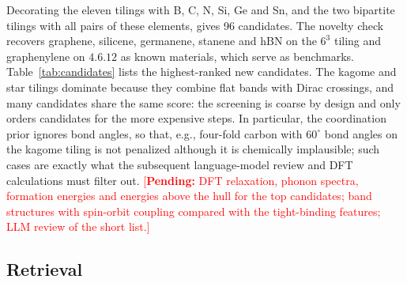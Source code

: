 \documentclass[prmaterials,twocolumn,superscriptaddress,longbibliography,nofootinbib]{revtex4-2}
\newcommand{\pending}[1]{\textcolor{red}{[\textbf{Pending:} #1]}}
\begin{document}
\begin{table}[t]
\caption{Highest-ranked new candidates for B, C, N, Si, Ge and Sn before any first-principles
calculation: tiling, coordination $z$, first-guess bond length $d$ from covalent radii,
flat bands, linear crossings and screening score.}
\label{tab:candidates}
\footnotesize

\end{table}

Decorating the eleven tilings with B, C, N, Si, Ge and Sn, and the two bipartite tilings
with all pairs of these elements, gives 96 candidates. The novelty check recovers graphene,
silicene, germanene, stanene and hBN on the $6^3$ tiling and graphenylene on $4.6.12$ as
known materials, which serve as benchmarks. Table~\ref{tab:candidates} lists the
highest-ranked new candidates. The kagome and star tilings dominate because they combine flat
bands with Dirac crossings, and many candidates share the same score: the screening is
coarse by design and only orders candidates for the more expensive steps. In particular, the
coordination prior ignores bond angles, so that, e.g., four-fold carbon with $60^\circ$ bond
angles on the kagome tiling is not penalized although it is chemically implausible; such
cases are exactly what the subsequent language-model review and DFT calculations must filter
out. \pending{DFT relaxation, phonon spectra, formation energies and energies above the hull
for the top candidates; band structures with spin-orbit coupling compared with the
tight-binding features; LLM review of the short list.}

\subsection{Retrieval}

\begin{table}[t]
\caption{Retrieval on the 3799-record knowledge base: recall@$k$ (R@$k$) of the records that
hold the answer and mean reciprocal rank over the top 8, for the lexical (feature hashing) and
dense (BGE-small through sentence-transformers) embedders, with ($\beta=0.25$) and without
($\beta=0$) the bonus for exact formula or name matches.}
\label{tab:retrieval}
\footnotesize

\end{table}
\end{document}
